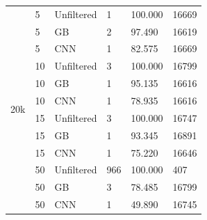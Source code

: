\begin{table}[t]
\begin{tabular}{|l|l|l|l|l|l|}
\hline
\multirow{12}{*}{20k}
& 5  & Unfiltered & 1   & 100.000 & 16669 \\
& 5  & GB         & 2   & 97.490  & 16619 \\
& 5  & CNN        & 1   & 82.575  & 16669 \\
& 10 & Unfiltered & 3   & 100.000 & 16799 \\
& 10 & GB         & 1   & 95.135  & 16616 \\
& 10 & CNN        & 1   & 78.935  & 16616 \\
& 15 & Unfiltered & 3   & 100.000 & 16747 \\
& 15 & GB         & 1   & 93.345  & 16891 \\
& 15 & CNN        & 1   & 75.220  & 16646 \\
& 50 & Unfiltered & 966 & 100.000 & 407 \\
& 50 & GB         & 3   & 78.485  & 16799 \\
& 50 & CNN        & 1   & 49.890  & 16745 \\
\hline
\end{tabular}
\end{table}

\FloatBarrier